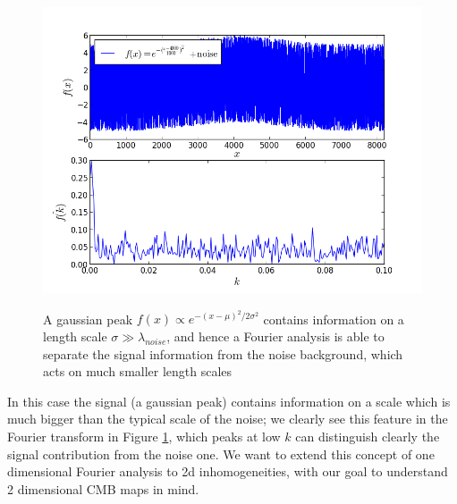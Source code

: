 \begin{figure}
\begin{center}
\includegraphics[scale=0.6]{Fourier/gauss+noise.png}
\label{}
\end{center}
\caption{A gaussian peak $f(x)\propto e^{-(x-\mu)^2/2\sigma^2}$ contains information on a length scale $\sigma \gg \lambda_{noise}$, and hence a Fourier analysis is able to separate the signal information from the noise background, which acts on much smaller length scales }
\label{gaussnoise}
\end{figure}
In this case the signal (a gaussian peak) contains information on a scale which is much bigger than the typical scale of the noise; we clearly see this feature in the Fourier transform in Figure \ref{gaussnoise}, which peaks at low $k$ can distinguish clearly the signal contribution from the noise one. We want to extend this concept of one dimensional Fourier analysis to 2d inhomogeneities, with our goal to understand 2 dimensional CMB maps in mind. 
